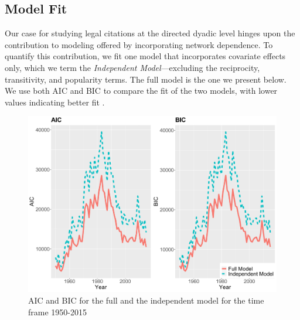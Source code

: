 \documentclass[headsepline=true, abstracton]{scrartcl}
\begin{document}



  
  
\subsection{Model Fit}

Our case for studying legal citations at the directed dyadic level hinges upon the contribution to modeling offered by incorporating network dependence. To quantify this contribution, we fit one model that incorporates covariate effects only, which we term the {\em Independent Model}---excluding the reciprocity, transitivity, and popularity terms. The full model is the one we present below. We use both AIC and BIC to compare the fit of the two models, with lower values indicating better fit \citep{ripplinger2008does}.  

  \begin{figure}[t]
\includegraphics[width=15cm]{SCC_AIC_BIC}
\caption{AIC and BIC for the full and the independent model for the time frame 1950-2015 }
 \label{AIC_BIC}
\vspace{-.25cm}
\end{figure}  
\end{document}
